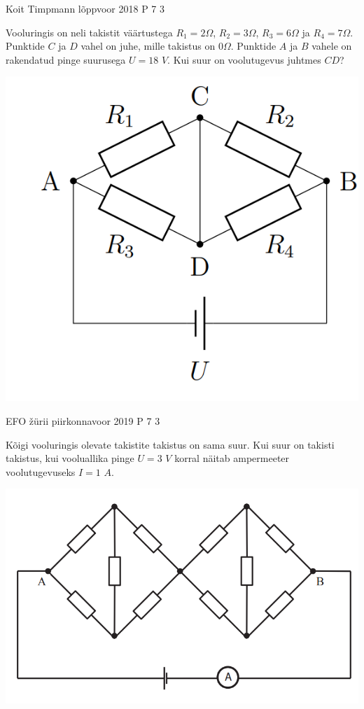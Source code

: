 \documentclass[11pt]{article}
\begin{document}
{%
{Koit Timpmann} %
{lõppvoor} %
{2018} %
{P 7} %
{3} %
{
\ifStatement
Vooluringis on neli takistit väärtustega $R_1 = 2 \Omega$, $R_2 = 3 \Omega$, $R_3 = 6 \Omega$ ja $R_4 = 7 \Omega$. Punktide $C$ ja $D$ vahel on juhe, mille takistus on $0 \Omega$. Punktide $A$ ja $B$ vahele on rakendatud pinge suurusega $U = 18$ $V$. Kui suur on voolutugevus juhtmes $CD$?
\begin{center}
	\includegraphics[width=0.5\linewidth]{2018-v3p-07-yl.png}
\end{center}
\fi
}

{EFO žürii} %
{piirkonnavoor} %
{2019} %
{P 7} %
{3} %
{
\ifStatement
Kõigi vooluringis olevate takistite takistus on sama suur. Kui suur on takisti takistus, kui vooluallika pinge $U = 3$ $V$ korral näitab ampermeeter voolutugevuseks $I = 1$ $A$.
\begin{center}
	\includegraphics[width=0.5\linewidth]{2019-v2p-07-yl.png}
\end{center}
\fi
}

}
\end{document}
